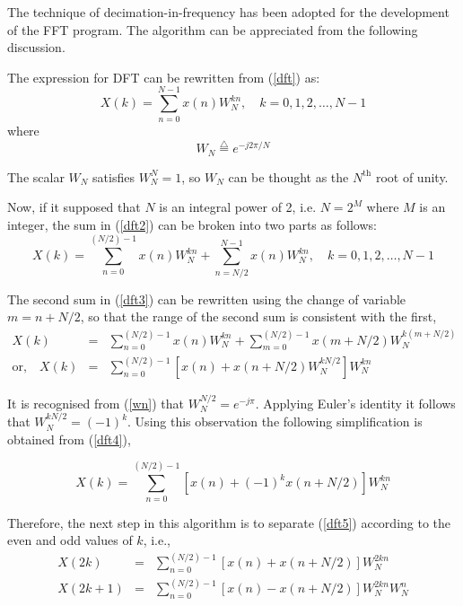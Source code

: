 \documentclass[a4paper,11pt]{report}
\begin{document}
The technique of decimation-in-frequency has been adopted for the development of the FFT program. The algorithm can be appreciated from the following discussion.

The expression for DFT can be rewritten from (\ref{dft}) as:
\begin{equation} \label{dft2}
X(k) = \sum_{n=0}^{N-1} x(n) W_{N}^{kn}, \quad k=0,1,2,\ldots,N-1
\end{equation}
where 
\begin{equation} \label{wn}
W_{N} \stackrel{\triangle}{=} e^{-j2\pi/N}
\end{equation}

The scalar $W_{N}$ satisfies $W_{N}^{N}=1$, so $W_{N}$ can be thought as the $N^{\mathrm{th}}$ root of unity.

Now, if it supposed that $N$ is an integral power of 2, i.e. $N=2^{M}$ where $M$ is an integer, the sum in (\ref{dft2}) can be broken into two parts as follows: 
\begin{equation} \label{dft3}
X(k) = \sum_{n=0}^{(N/2) - 1} x(n) W_{N}^{kn} + \sum_{n=N/2}^{N-1} x(n) W_{N}^{kn}, \quad k=0,1,2,\ldots,N-1
\end{equation}

The second sum in (\ref{dft3}) can be rewritten using the change of variable $m=n+N/2$, so that the range of the second sum is consistent with the first, 
\begin{eqnarray} 
X(k) & = & \sum_{n=0}^{(N/2) - 1} x(n) W_{N}^{kn} + \sum_{m=0}^{(N/2)-1} x(m+N/2) W_{N}^{k(m+N/2)} \nonumber \\
\textrm{or,}\quad X(k) & = & \sum_{n=0}^{(N/2) - 1} \left[ x(n) + x(n+N/2) W_{N}^{kN/2} \right] W_{N}^{kn} \label{dft4}
\end{eqnarray}

It is recognised from (\ref{wn}) that $W_{N}^{N/2} = e^{-j\pi}$. Applying Euler's identity it follows that $W_{N}^{kN/2} = (-1)^{k}$. Using this observation the following simplification is obtained from (\ref{dft4}),

\begin{equation} \label{dft5}
X(k) = \sum_{n=0}^{(N/2) - 1} \left[ x(n) + (-1)^{k} x(n+N/2) \right] W_{N}^{kn}
\end{equation}

Therefore, the next step in this algorithm is to separate (\ref{dft5}) according to the even and odd values of $k$, i.e., 
\begin{eqnarray}
X(2k) & = & \sum_{n=0}^{(N/2) - 1} \left[ x(n) + x(n+N/2) \right] W_{N}^{2kn} \label{even}\\
X(2k+1) & = & \sum_{n=0}^{(N/2) - 1} \left[ x(n) - x(n+N/2) \right] W_{N}^{2kn} W_{N}^{n} \label{odd}
\end{eqnarray}
\end{document}
